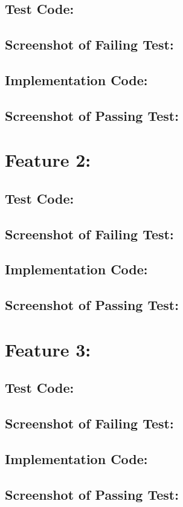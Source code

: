 \documentclass{article}
\begin{document}
\subsection*{Test Code:}
\vspace*{5cm}
\subsection*{Screenshot of Failing Test:}
\vspace*{5cm}
\subsection*{Implementation Code:}
\vspace*{5cm}
\subsection*{Screenshot of Passing Test:}
\vspace*{5cm}

\newpage
\section*{Feature 2:}
\subsection*{Test Code:}
\vspace*{5cm}
\subsection*{Screenshot of Failing Test:}
\vspace*{5cm}
\subsection*{Implementation Code:}
\vspace*{5cm}
\subsection*{Screenshot of Passing Test:}
\vspace*{5cm}

\newpage
\section*{Feature 3:}
\subsection*{Test Code:}
\vspace*{5cm}
\subsection*{Screenshot of Failing Test:}
\vspace*{5cm}
\subsection*{Implementation Code:}
\vspace*{5cm}
\subsection*{Screenshot of Passing Test:}
\vspace*{5cm}
\end{document}
